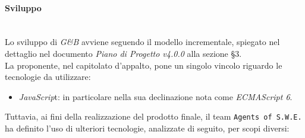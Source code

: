 \paragraph{Sviluppo} \-\\
\label{Progettazione_Sviluppo}
Lo sviluppo di \textit{G\&B} avviene seguendo il modello incrementale, spiegato nel dettaglio nel documento \textit{Piano di Progetto v4.0.0} alla sezione §3.\\
La proponente, nel capitolato d'appalto, pone un singolo vincolo riguardo le tecnologie da utilizzare:
\begin{itemize}
	\item \textit{JavaScrip}t: in particolare nella sua declinazione nota come \textit{ECMAScript 6}\glossario.
\end{itemize}
Tuttavia, ai fini della realizzazione del prodotto finale, il team \texttt{Agents of S.W.E.} ha definito l'uso di ulteriori tecnologie, analizzate di seguito, per scopi diversi:
